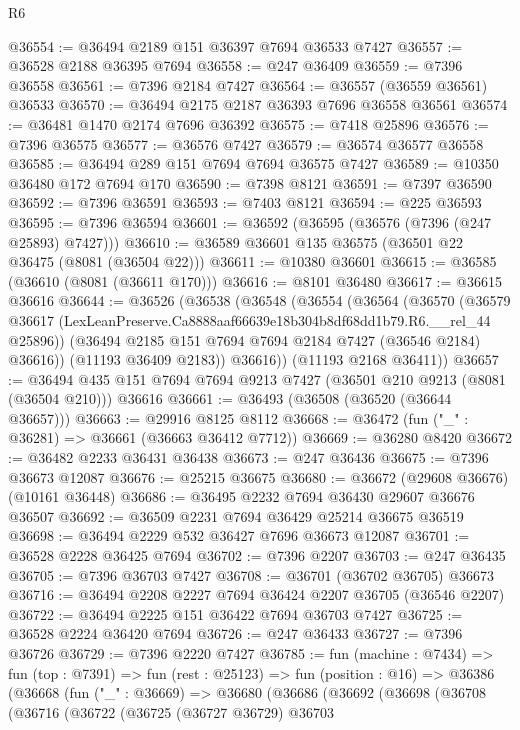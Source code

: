\begin{lexlean}{R6}
\begin{coremodule}
@36554 := @36494 @2189 @151 @36397 @7694 @36533 @7427
@36557 := @36528 @2188 @36395 @7694
@36558 := @247 @36409
@36559 := @7396 @36558
@36561 := @7396 @2184 @7427
@36564 := @36557 (@36559 @36561) @36533
@36570 := @36494 @2175 @2187 @36393 @7696 @36558 @36561
@36574 := @36481 @1470 @2174 @7696 @36392
@36575 := @7418 @25896
@36576 := @7396 @36575
@36577 := @36576 @7427
@36579 := @36574 @36577 @36558
@36585 := @36494 @289 @151 @7694 @7694 @36575 @7427
@36589 := @10350 @36480 @172 @7694 @170
@36590 := @7398 @8121
@36591 := @7397 @36590
@36592 := @7396 @36591
@36593 := @7403 @8121
@36594 := @225 @36593
@36595 := @7396 @36594
@36601 := @36592 (@36595 (@36576 (@7396 (@247 @25893) @7427)))
@36610 := @36589 @36601 @135 @36575 (@36501 @22 @36475 (@8081 (@36504 @22)))
@36611 := @10380 @36601
@36615 := @36585 (@36610 (@8081 (@36611 @170)))
@36616 := @8101 @36480
@36617 := @36615 @36616
@36644 := @36526
    (@36538
      (@36548
        (@36554
          (@36564
            (@36570
              (@36579 @36617 (LexLeanPreserve.Ca8888aaf66639e18b304b8df68dd1b79.R6.__rel_44 @25896))
              (@36494 @2185 @151 @7694 @7694 @2184 @7427 (@36546 @2184) @36616))
            (@11193 @36409 @2183))
          @36616))
      (@11193 @2168 @36411))
@36657 := @36494 @435 @151 @7694 @7694 @9213 @7427 (@36501 @210 @9213 (@8081 (@36504 @210))) @36616
@36661 := @36493 (@36508 (@36520 (@36644 @36657)))
@36663 := @29916 @8125 @8112
@36668 := @36472 (fun ("_" : @36281) => @36661 (@36663 @36412 @7712))
@36669 := @36280 @8420
@36672 := @36482 @2233 @36431 @36438
@36673 := @247 @36436
@36675 := @7396 @36673 @12087
@36676 := @25215 @36675
@36680 := @36672 (@29608 @36676) (@10161 @36448)
@36686 := @36495 @2232 @7694 @36430 @29607 @36676 @36507
@36692 := @36509 @2231 @7694 @36429 @25214 @36675 @36519
@36698 := @36494 @2229 @532 @36427 @7696 @36673 @12087
@36701 := @36528 @2228 @36425 @7694
@36702 := @7396 @2207
@36703 := @247 @36435
@36705 := @7396 @36703 @7427
@36708 := @36701 (@36702 @36705) @36673
@36716 := @36494 @2208 @2227 @7694 @36424 @2207 @36705 (@36546 @2207)
@36722 := @36494 @2225 @151 @36422 @7694 @36703 @7427
@36725 := @36528 @2224 @36420 @7694
@36726 := @247 @36433
@36727 := @7396 @36726
@36729 := @7396 @2220 @7427
@36785 := fun (machine : @7434) =>
  fun (top : @7391) =>
  fun (rest : @25123) =>
  fun (position : @16) =>
  @36386
    (@36668
      (fun ("_" : @36669) =>
      @36680
        (@36686
          (@36692
            (@36698
              (@36708
                (@36716
                  (@36722
                    (@36725
                      (@36727 @36729)
                      @36703

\end{coremodule}
\end{lexlean}
